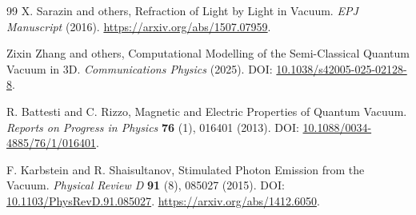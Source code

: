 \documentclass[12pt]{article}
\begin{document}
\begin{thebibliography}{99}
X. Sarazin and others,
\newblock Refraction of Light by Light in Vacuum.
\textit{EPJ Manuscript} (2016).
\newblock \url{https://arxiv.org/abs/1507.07959}.


Zixin Zhang and others,
\newblock Computational Modelling of the Semi-Classical Quantum Vacuum in 3D.
\textit{Communications Physics} (2025).
\newblock DOI: \href{https://doi.org/10.1038/s42005-025-02128-8}{10.1038/s42005-025-02128-8}.


R. Battesti and C. Rizzo,
\newblock Magnetic and Electric Properties of Quantum Vacuum.
\textit{Reports on Progress in Physics} \textbf{76} (1), 016401 (2013).
\newblock DOI: \href{https://doi.org/10.1088/0034-4885/76/1/016401}{10.1088/0034-4885/76/1/016401}.


F. Karbstein and R. Shaisultanov,
\newblock Stimulated Photon Emission from the Vacuum.
\textit{Physical Review D} \textbf{91} (8), 085027 (2015).
\newblock DOI: \href{https://doi.org/10.1103/PhysRevD.91.085027}{10.1103/PhysRevD.91.085027}.
\newblock \url{https://arxiv.org/abs/1412.6050}.


\end{thebibliography}
\end{document}

